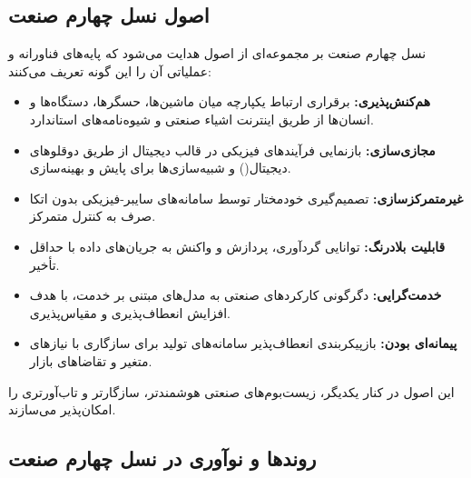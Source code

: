 \subsection{اصول نسل چهارم صنعت}

نسل چهارم صنعت بر مجموعه‌ای از اصول هدایت می‌شود که پایه‌های فناورانه و عملیاتی آن را این گونه تعریف می‌کنند:

\begin{itemize}
\item
\textbf{هم‌کنش‌پذیری:} برقراری ارتباط یکپارچه میان ماشین‌ها، حسگرها، دستگاه‌ها و انسان‌ها از طریق اینترنت اشیاء صنعتی و شیوه‌نامه‌های استاندارد.

\item
\textbf{مجازی‌سازی:} بازنمایی فرآیندهای فیزیکی در قالب دیجیتال از طریق دوقلوهای دیجیتال() و شبیه‌سازی‌ها برای پایش و بهینه‌سازی.

\item
\textbf{غیرمتمرکزسازی:} تصمیم‌گیری خودمختار توسط سامانه‌های سایبر-فیزیکی بدون اتکا صرف به کنترل متمرکز.

\item
\textbf{قابلیت بلادرنگ:} توانایی گردآوری، پردازش و واکنش به جریان‌های داده با حداقل تأخیر.

\item
\textbf{خدمت‌گرایی:} دگرگونی کارکردهای صنعتی به مدل‌های مبتنی بر خدمت، با هدف افزایش انعطاف‌پذیری و مقیاس‌پذیری.

\item
\textbf{پیمانه‌ای بودن:} بازپیکربندی انعطاف‌پذیر سامانه‌های تولید برای سازگاری با نیازهای متغیر و تقاضاهای بازار.
\end{itemize}

این اصول در کنار یکدیگر، زیست‌بوم‌های صنعتی هوشمندتر، سازگارتر و تاب‌آورتری را امکان‌پذیر می‌سازند.

\subsection{روندها و نوآوری در نسل چهارم صنعت}

